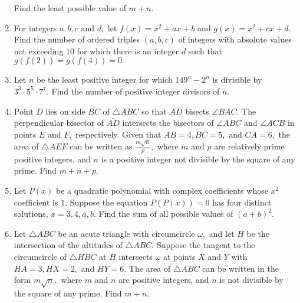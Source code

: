 \documentclass{article}
\begin{document}
\begin{enumerate}[label=\arabic*., itemsep=0.5em]
Find the least possible value of $m+n.$\par \vspace{0.5em}\item For integers $a,b,c$ and $d,$ let $f(x)=x^2+ax+b$ and $g(x)=x^2+cx+d.$ Find the number of ordered triples $(a,b,c)$ of integers with absolute values not exceeding $10$ for which there is an integer $d$ such that $g(f(2))=g(f(4))=0.$\par \vspace{0.5em}\item Let $n$ be the least positive integer for which $149^n-2^n$ is divisible by $3^3\cdot5^5\cdot7^7.$ Find the number of positive integer divisors of $n.$\par \vspace{0.5em}\item Point $D$ lies on side $\overline{BC}$ of $\triangle ABC$ so that $\overline{AD}$ bisects $\angle BAC.$ The perpendicular bisector of $\overline{AD}$ intersects the bisectors of $\angle ABC$ and $\angle ACB$ in points $E$ and $F,$ respectively. Given that $AB=4,BC=5,$ and $CA=6,$ the area of $\triangle AEF$ can be written as $\tfrac{m\sqrt{n}}p,$ where $m$ and $p$ are relatively prime positive integers, and $n$ is a positive integer not divisible by the square of any prime. Find $m+n+p$.\par \vspace{0.5em}\item Let $P(x)$ be a quadratic polynomial with complex coefficients whose $x^2$ coefficient is $1.$ Suppose the equation $P(P(x))=0$ has four distinct solutions, $x=3,4,a,b.$ Find the sum of all possible values of $(a+b)^2.$\par \vspace{0.5em}\item Let $\triangle ABC$ be an acute triangle with circumcircle $\omega,$ and let $H$ be the intersection of the altitudes of $\triangle ABC.$ Suppose the tangent to the circumcircle of $\triangle HBC$ at $H$ intersects $\omega$ at points $X$ and $Y$ with $HA=3,HX=2,$ and $HY=6.$ The area of $\triangle ABC$ can be written in the form $m\sqrt{n},$ where $m$ and $n$ are positive integers, and $n$ is not divisible by the square of any prime. Find $m+n.$





\end{enumerate}
\end{document}
